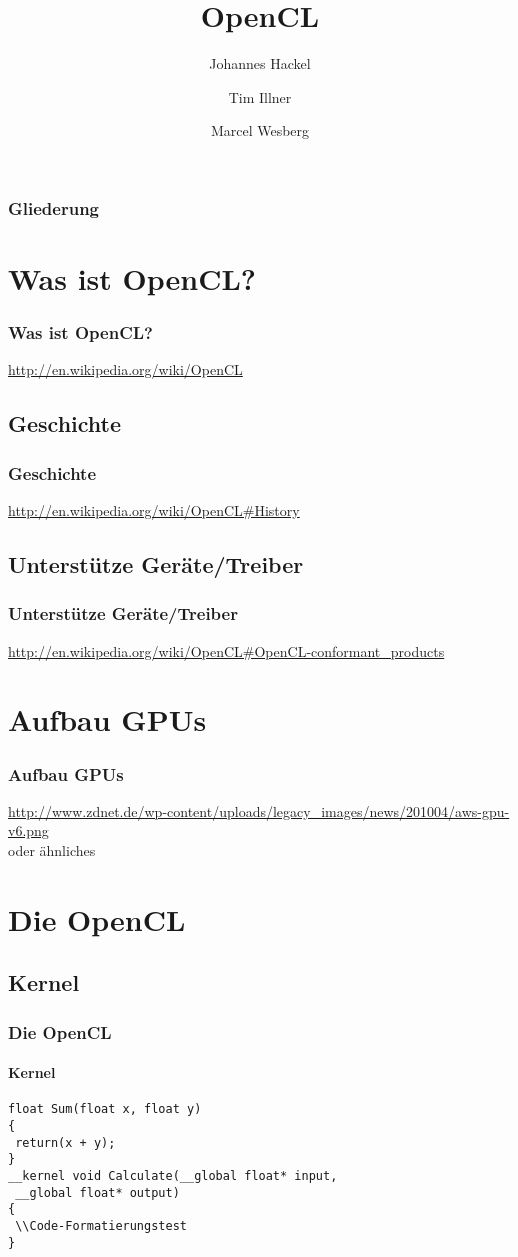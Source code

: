 \documentclass{beamer}
\author{Johannes Hackel \and Tim Illner \and Marcel Wesberg}
\title{OpenCL}
\begin{document}
\begin{frame}
\titlepage
\end{frame}

\begin{frame}
\frametitle{Gliederung}
\tableofcontents
\end{frame}

\section{Was ist OpenCL?}
\begin{frame}[fragile]
\frametitle{Was ist OpenCL?}
\url{http://en.wikipedia.org/wiki/OpenCL}
\end{frame}
\subsection{Geschichte}
\begin{frame}[fragile]
\frametitle{Geschichte}
\url{http://en.wikipedia.org/wiki/OpenCL#History}
\end{frame}
\subsection{Unterstütze Geräte/Treiber}
\begin{frame}[fragile]
\frametitle{Unterstütze Geräte/Treiber}
\url{http://en.wikipedia.org/wiki/OpenCL#OpenCL-conformant_products}
\end{frame}

\section{Aufbau GPUs}
\begin{frame}[fragile]
\frametitle{Aufbau GPUs}
\url{http://www.zdnet.de/wp-content/uploads/legacy_images/news/201004/aws-gpu-v6.png}\\
oder ähnliches
\end{frame}

\section{Die OpenCL}
\subsection{Kernel}
\begin{frame}[fragile]
\frametitle{Die OpenCL}
\framesubtitle{Kernel}
\begin{lstlisting}
float Sum(float x, float y)
{
 return(x + y);
}
__kernel void Calculate(__global float* input,
 __global float* output)
{
 \\Code-Formatierungstest
}
\end{lstlisting}
\end{frame}
\end{document}
